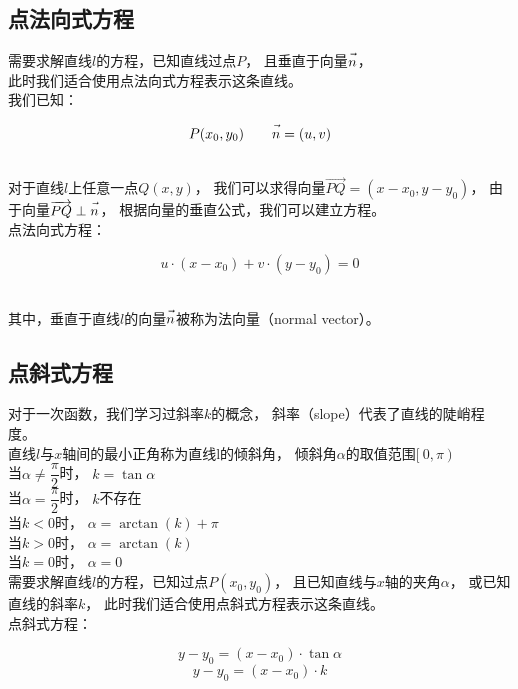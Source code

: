 \documentclass[UTF8]{ctexart}
\let\nvec\vec
\def\vec#1{\nvec{\vphantom b\smash{#1}}}
\begin{document}
\newpage

\subsection{点法向式方程}
    需要求解直线$l$的方程，已知直线过点$P$，
    且垂直于向量$\vec n$，\\[1mm]
    此时我们适合使用点法向式方程表示这条直线。\\[3mm]
    我们已知：
    \begin{large}
        \begin{equation*}
            P(x_{0},y_{0})\qquad
            \vec n = (u,v)
        \end{equation*}
    \end{large}\\
    对于直线$l$上任意一点$Q(x,y)$，
    我们可以求得向量$\overrightarrow{PQ}=(x-x_0,y-y_0)$，
    由于向量$\overrightarrow{PQ}\perp\vec{n}$，
    根据向量的垂直公式，我们可以建立方程。\\[3mm]
    点法向式方程：
    \begin{large}
        \begin{equation*}
            u \cdot (x-x_{0})+v \cdot (y-y_{0}) = 0
        \end{equation*}
    \end{large}\\
    其中，垂直于直线$l$的向量$\vec n$被称为法向量（normal vector）。\\

\subsection{点斜式方程}
    对于一次函数，我们学习过斜率$k$的概念，
    斜率（slope）代表了直线的陡峭程度。\\[3mm]
    直线$l$与$x$轴间的最小正角称为直线l的倾斜角，
    倾斜角$\alpha$的取值范围$[\ 0,\pi\ )$\\[6mm]
    当$\alpha \neq \dfrac{\pi}{2}$时，
    $k = \tan \alpha$\\[3mm]
    当$\alpha = \dfrac{\pi}{2}$时，
    $k$不存在\\[6mm]
    当$k<0$时，
    $\alpha=\arctan{(k)}+\pi$\\[3mm]
    当$k>0$时，
    $\alpha=\arctan{(k)}$\\[3mm]
    当$k=0$时，
    $\alpha=0$\\[6mm]
    需要求解直线$l$的方程，已知过点$P(x_{0},y_{0})$，
    且已知直线与$x$轴的夹角$\alpha$，
    或已知直线的斜率$k$，
    此时我们适合使用点斜式方程表示这条直线。\\[3mm]
    点斜式方程：
    \begin{large}
        \begin{equation*}
            y-y_{0} = (x-x_{0}) \cdot \tan \alpha
        \end{equation*}
        \begin{equation*}
            y-y_{0} = (x-x_{0}) \cdot k
        \end{equation*}
    \end{large}
\end{document}
